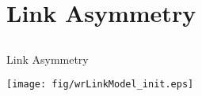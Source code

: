 \documentclass[compress,red]{beamer}
\begin{document}
\section{Link Asymmetry}
\subsection{}
\begin{frame}{Link Asymmetry}

  \begin{center}
  \texttt{[image: fig/wrLinkModel\_init.eps]}
  \end{center}

\end{frame}

\end{document}

